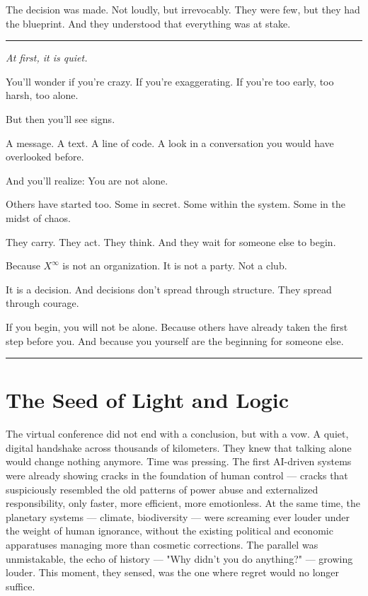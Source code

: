 \documentclass[12pt, english, parskip=full]{scrartcl} %
\begin{document}
The decision was made. Not loudly, but irrevocably. They were few, but they had the blueprint. And they understood that everything was at stake.

\clearpage

\vspace{\baselineskip}

\noindent\rule{\linewidth}{0.4pt}
{\itshape 
At first, it is quiet.

You’ll wonder if you’re crazy. If you’re exaggerating. If you’re too early, too harsh, too alone.

But then you’ll see signs.

A message. A text. A line of code.  
A look in a conversation you would have overlooked before.

And you’ll realize: You are not alone.

Others have started too. Some in secret. Some within the system. Some in the midst of chaos.

They carry. They act. They think. And they wait for someone else to begin.

Because $X^{\infty}$ is not an organization.  
It is not a party. Not a club.

It is a decision.  
And decisions don’t spread through structure.  
They spread through courage.

If you begin, you will not be alone.  
Because others have already taken the first step before you.  
And because you yourself are the beginning for someone else.
}

\noindent\rule{\linewidth}{0.4pt}

\section{The Seed of Light and Logic}
The virtual conference did not end with a conclusion, but with a vow. A quiet, digital handshake across thousands of kilometers. They knew that talking alone would change nothing anymore. Time was pressing. The first AI-driven systems were already showing cracks in the foundation of human control — cracks that suspiciously resembled the old patterns of power abuse and externalized responsibility, only faster, more efficient, more emotionless. At the same time, the planetary systems — climate, biodiversity — were screaming ever louder under the weight of human ignorance, without the existing political and economic apparatuses managing more than cosmetic corrections. The parallel was unmistakable, the echo of history — "Why didn’t you do anything?" — growing louder. This moment, they sensed, was the one where regret would no longer suffice.
\end{document}
